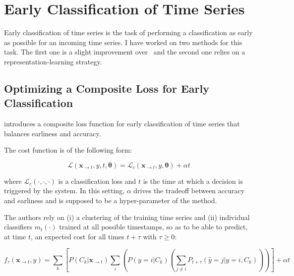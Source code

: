 \section{Early Classification of Time Series}
\label{sec:early}

Early classification of time series is the task of performing a classification
as early as possible for an incoming time series.
I have worked on two methods for this task.
The first one is a slight improvement
over~\cite{dachraoui2015early} and the second one relies on a
representation-learning strategy.

\subsection{Optimizing a Composite Loss for Early Classification}

\cite{dachraoui2015early} introduces a composite loss function for early
classification of time series that balances earliness and accuracy.

The cost function is of the following form:

\begin{equation}
\mathcal{L}(\mathbf{x}_{\rightarrow t}, y, t, \boldsymbol{\theta}) =
    \mathcal{L}_c(\mathbf{x}_{\rightarrow t}, y, \boldsymbol{\theta}) + \alpha t
\label{eq:loss_early}
\end{equation}

\noindent
where $\mathcal{L}_c(\cdot,\cdot,\cdot)$ is a
classification loss and $t$ is the time at which a
decision is triggered by the system.
In this setting, $\alpha$ drives the tradeoff between accuracy and earliness
and is supposed to be a hyper-parameter of the method.

The authors rely on (i) a clustering of the
training
time series and (ii) individual classifiers $m_t(\cdot)$ trained at all possible
timestamps, so as to be able to predict, at time $t$, an expected cost for all
times $t + \tau$ with $\tau \geq 0$:

\begin{equation}
    f_\tau(\mathbf{x}_{\rightarrow t}, y) =
        \sum_k \left[ P(C_k | \mathbf{x}_{\rightarrow t})
        \sum_i \left( P(y=i | C_k)
        \left( \sum_{j \neq i} P_{t+\tau}(\hat{y} = j | y=i, C_k)
        \right) \right)
        \right]
        + \alpha t
        \label{eq:dachraoui}
\end{equation}


